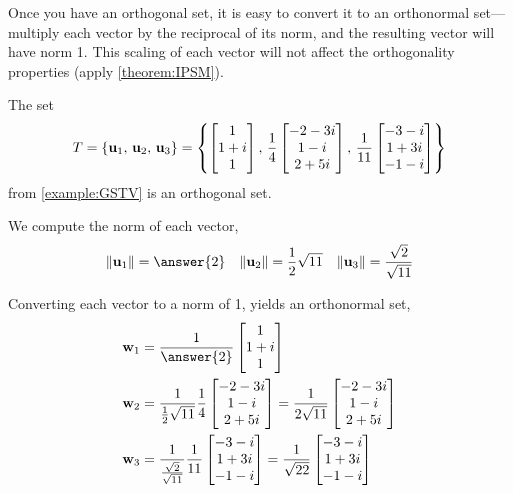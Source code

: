 \documentclass{ximera}
\begin{document}
Once you have an orthogonal set, it is easy to convert it to an
orthonormal set---multiply each vector by the reciprocal of its norm,
and the resulting vector will have norm 1.  This scaling of each
vector will not affect the orthogonality properties (apply
\ref{theorem:IPSM}).

\begin{example}

The set
\[
T=\left\{\mathbf{u}_1,\,\mathbf{u}_2,\,\mathbf{u}_3\right\}
=\left\{
\begin{bmatrix}1\\1+i\\1\end{bmatrix},\,
\frac{1}{4}\begin{bmatrix}-2-3i\\1-i\\2+5i\end{bmatrix},\,
\frac{1}{11}\begin{bmatrix}-3-i\\1+3i\\-1-i\end{bmatrix}
\right\}
\]
from \ref{example:GSTV} is an orthogonal set.

We compute the norm of each vector,
\begin{align*}
\norm{\vect{u}_1}=\answer{2}&&
\norm{\vect{u}_2}=\frac{1}{2}\sqrt{11}&&
\norm{\vect{u}_3}=\frac{\sqrt{2}}{\sqrt{11}}
\end{align*}




Converting each vector to a norm of 1, yields an orthonormal set,
\begin{align*}
\vect{w}_1&=\frac{1}{\answer{2}}\colvector{1\\1+i\\1}\\
\vect{w}_2&=\frac{1}{\frac{1}{2}\sqrt{11}}\frac{1}{4}\colvector{-2-3i\\1-i\\2+5i}=\frac{1}{2\sqrt{11}}\colvector{-2-3i\\1-i\\2+5i}\\
\vect{w}_3&=\frac{1}{\frac{\sqrt{2}}{\sqrt{11}}}\frac{1}{11}\colvector{-3-i\\1+3i\\-1-i}=\frac{1}{\sqrt{22}}\colvector{-3-i\\1+3i\\-1-i}
\end{align*}

\end{example}
\end{document}
